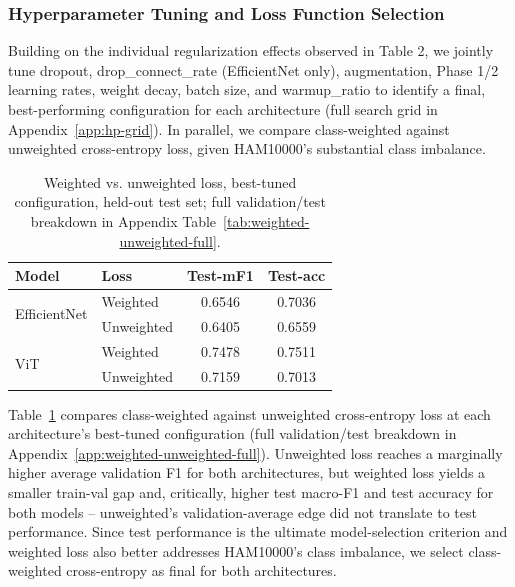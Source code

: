 \documentclass[10pt,twocolumn,letterpaper]{article}
\begin{document}
\subsubsection{Hyperparameter Tuning and Loss Function Selection}
Building on the individual regularization effects observed in Table 2, we jointly tune dropout, drop\_connect\_rate (EfficientNet only), augmentation, Phase 1/2 learning rates, weight decay, batch size, and warmup\_ratio to identify a final, best-performing configuration for each architecture (full search grid in Appendix~\ref{app:hp-grid}). In parallel, we compare class-weighted against unweighted cross-entropy loss, given HAM10000's substantial class imbalance.

\begin{table}[t]
	\centering
	\footnotesize
	\setlength{\tabcolsep}{4pt}
	\begin{tabular}{llcc}
		\toprule
		Model & Loss & Test-mF1 & Test-acc \\
		\midrule
		\multirow{2}{*}{EfficientNet} & Weighted & 0.6546 & 0.7036 \\
		 & Unweighted & 0.6405 & 0.6559 \\
		\midrule
		\multirow{2}{*}{ViT} & Weighted & 0.7478 & 0.7511 \\
		 & Unweighted & 0.7159 & 0.7013 \\
		\bottomrule
	\end{tabular}
	\caption{Weighted vs. unweighted loss, best-tuned configuration, held-out
	test set; full validation/test breakdown in Appendix
	Table~\ref{tab:weighted-unweighted-full}.}
	\label{tab:weighted-unweighted}
\end{table}

Table~\ref{tab:weighted-unweighted} compares class-weighted against unweighted
cross-entropy loss at each architecture's best-tuned configuration (full
validation/test breakdown in Appendix~\ref{app:weighted-unweighted-full}).
Unweighted loss reaches a marginally higher average validation F1 for both
architectures, but weighted loss yields a smaller train-val gap and,
critically, higher test macro-F1 and test accuracy for both models --
unweighted's validation-average edge did not translate to test performance.
Since test performance is the ultimate model-selection criterion and weighted
loss also better addresses HAM10000's class imbalance, we select
class-weighted cross-entropy as final for both architectures.
\end{document}
